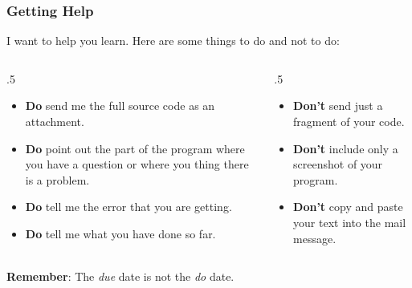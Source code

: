\begin{frame}
  \frametitle{Getting Help}

  I want to help you learn.
  Here are some things to do and not to do:

  \begin{columns}[t]
    \begin{column}{.5\textwidth}
      \begin{itemize}
      \item \textbf{Do} send me the full source code as an attachment.
      \item \textbf{Do} point out the part of the program where you have a question or where you thing there is a problem.
      \item \textbf{Do} tell me the error that you are getting.
      \item \textbf{Do} tell me what you have done so far.
      \end{itemize}
    \end{column}

    \begin{column}{.5\textwidth}

      \begin{itemize}
      \item \textbf{Don't} send just a fragment of your code.
      \item \textbf{Don't} include only a screenshot of your program.
      \item \textbf{Don't} copy and paste your text into the mail message.
      \end{itemize}
      
    \end{column}
  \end{columns}

  \vspace{0.5em}
  \centerline{\textbf{Remember}: The \emph{due} date is not the \emph{do} date.}
\end{frame}
